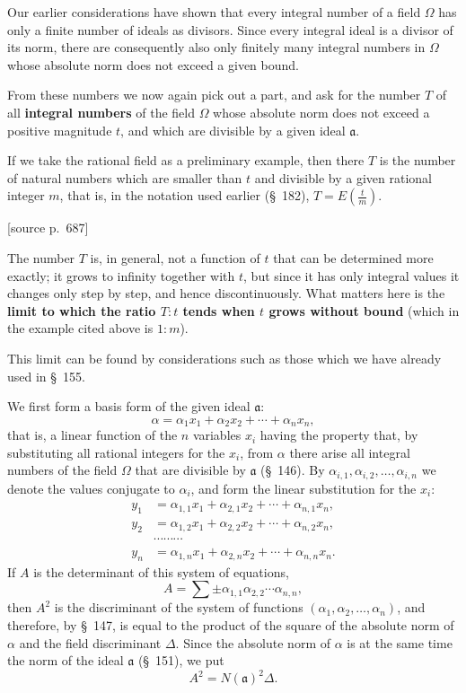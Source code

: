 \documentclass[11pt]{article}
\newcommand{\srcpage}[1]{\par\medskip\noindent\textsf{[source p.~#1]}\par\smallskip}
\begin{document}
Our earlier considerations have shown that every integral number of a field $\Omega$ has only a finite number of ideals as divisors. Since every integral ideal is a divisor of its norm, there are consequently also only finitely many integral numbers in $\Omega$ whose absolute norm does not exceed a given bound.

From these numbers we now again pick out a part, and ask for the number $T$ of all \textbf{integral numbers} of the field $\Omega$ whose absolute norm does not exceed a positive magnitude $t$, and which are divisible by a given ideal $\mathfrak a$.

If we take the rational field as a preliminary example, then there $T$ is the number of natural numbers which are smaller than $t$ and divisible by a given rational integer $m$, that is, in the notation used earlier (\S~182), $T=E\left(\frac{t}{m}\right)$.

\srcpage{687}
The number $T$ is, in general, not a function of $t$ that can be determined more exactly; it grows to infinity together with $t$, but since it has only integral values it changes only step by step, and hence discontinuously. What matters here is the \textbf{limit to which the ratio $T:t$ tends when $t$ grows without bound} (which in the example cited above is $1:m$).

This limit can be found by considerations such as those which we have already used in \S~155.

We first form a basis form of the given ideal $\mathfrak a$:
\begin{equation}
\alpha=\alpha_1x_1+\alpha_2x_2+\cdots+\alpha_nx_n,
\tag{1}
\end{equation}
that is, a linear function of the $n$ variables $x_i$ having the property that, by substituting all rational integers for the $x_i$, from $\alpha$ there arise all integral numbers of the field $\Omega$ that are divisible by $\mathfrak a$ (\S~146). By $\alpha_{i,1},\alpha_{i,2},\ldots,\alpha_{i,n}$ we denote the values conjugate to $\alpha_i$, and form the linear substitution for the $x_i$:
\begin{equation}
\begin{aligned}
y_1&=\alpha_{1,1}x_1+\alpha_{2,1}x_2+\cdots+\alpha_{n,1}x_n,\\
y_2&=\alpha_{1,2}x_1+\alpha_{2,2}x_2+\cdots+\alpha_{n,2}x_n,\\
&\cdots\cdots\cdots\\
y_n&=\alpha_{1,n}x_1+\alpha_{2,n}x_2+\cdots+\alpha_{n,n}x_n.
\end{aligned}
\tag{2}
\end{equation}
If $A$ is the determinant of this system of equations,
\[
A=\sum\pm\alpha_{1,1}\alpha_{2,2}\cdots\alpha_{n,n},
\]
then $A^2$ is the discriminant of the system of functions $(\alpha_1,\alpha_2,\ldots,\alpha_n)$, and therefore, by \S~147, is equal to the product of the square of the absolute norm of $\alpha$ and the field discriminant $\Delta$. Since the absolute norm of $\alpha$ is at the same time the norm of the ideal $\mathfrak a$ (\S~151), we put
\begin{equation}
A^2=N(\mathfrak a)^2\Delta.
\tag{3}
\end{equation}
\end{document}
